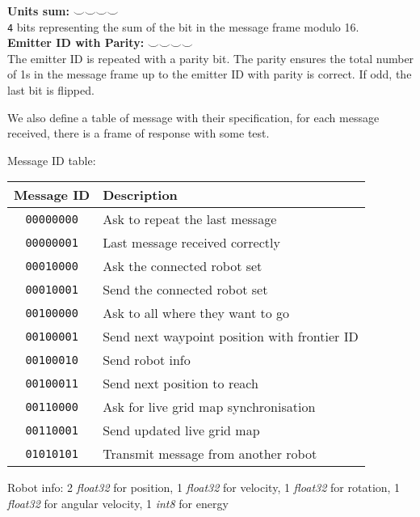 \documentclass[../main.tex]{subfiles}
\begin{document}
\textbf{Units sum:} $\smallsmile \smallsmile \smallsmile \smallsmile$\\
\texttt{4} bits representing the sum of the bit in the message frame modulo 16. \\ 

\textbf{Emitter ID with Parity:} $\smallsmile \smallsmile \smallsmile \smallsmile$\\
The emitter ID is repeated with a parity bit. The parity ensures the total number of 1s in the message frame up to the emitter ID with parity is correct. If odd, the last bit is flipped. \\

\vspace{1em}

We also define a table of message with their specification, for each message received, there is a frame of response with some test.

Message ID table:
\begin{table}[H]
	\centering
	\begin{tabular}{c l}
		\hline
		\textbf{Message ID} & \textbf{Description} \\
		\hline
		\texttt{00000000} & Ask to repeat the last message\\
		\texttt{00000001} & Last message received correctly\\[5pt]
		
		\texttt{00010000} & Ask the connected robot set\\
		\texttt{00010001} & Send the connected robot set\\[5pt]
		
		\texttt{00100000} & Ask to all where they want to go\\
		\texttt{00100001} & Send next waypoint position with frontier ID\\
		\texttt{00100010} & Send robot info\\
		\texttt{00100011} & Send next position to reach\\[5pt]
		
		\texttt{00110000} & Ask for live grid map synchronisation\\
		\texttt{00110001} & Send updated live grid map\\[5pt]
		
		\texttt{01010101} & Transmit message from another robot\\
		\hline
	\end{tabular}
\end{table}

Robot info:
2 \textit{float32} for position, 1 \textit{float32} for velocity, 1 \textit{float32} for rotation, 1 \textit{float32} for angular velocity, 1 \textit{int8} for energy\\
\end{document}
